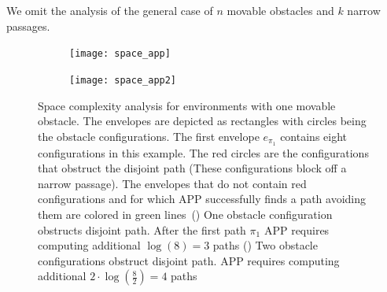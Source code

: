 \documentclass[a4paper]{report}
\begin{document}
We omit the analysis of the general case of $n$ movable obstacles and $k$ narrow passages.

\begin{figure}[H]
\begin{subfigure}{0.48\textwidth}
\centering
   \texttt{[image: space\_app]}
  \caption{}
  \label{fig:one_narrow}
\end{subfigure}
\hfill
\begin{subfigure}{0.48\textwidth}
\centering
   \texttt{[image: space\_app2]}
  \caption{}
  \label{fig:two_narrow}
\end{subfigure}
    \caption{Space complexity analysis for environments with one movable obstacle. The envelopes are depicted as rectangles with circles being the obstacle configurations. The first envelope $e_{\pi_1}$ contains eight configurations in this example. The red circles are the configurations that obstruct the disjoint path (These configurations block off a narrow passage). The envelopes that do not contain red configurations and for which APP successfully finds a path avoiding them are colored in green lines~() One obstacle configuration obstructs disjoint path. After the first path $\pi_1$ APP requires computing additional $\log (8) = 3$ paths () Two obstacle configurations obstruct disjoint path. APP requires computing additional $2 \cdot \log (\frac{8}{2}) = 4$ paths}
    \label{fig:app_space}
\end{figure}
\end{document}
